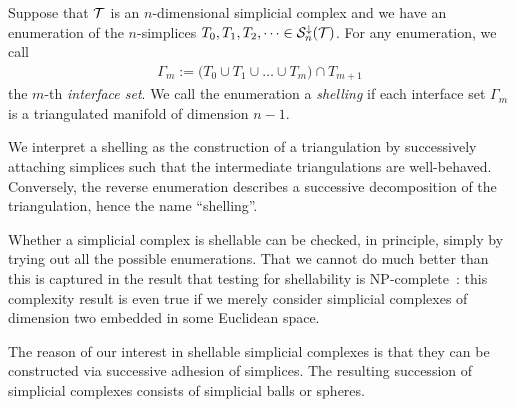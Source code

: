 \documentclass[10pt,a4paper]{article}
\newcommand{\mwl}[1]{{\color{red}#1}}
\begin{document}



Suppose that ${\mathcal T}$ is an $n$-dimensional simplicial complex and we have an enumeration of the $n$-simplices $T_{0}, T_{1}, T_{2}, \dots \in {\mathcal S}^{\downarrow}_{n}({\mathcal T})$.
For any enumeration, we call 
\begin{align*}
    \Gamma_m 
    := 
    \big( 
        T_{0} \cup T_{1} \cup \dots \cup T_{m} 
    \big) 
    \cap 
    T_{m+1}
\end{align*}
the $m$-th \textit{interface set}. 
We call the enumeration a \emph{shelling} if each interface set $\Gamma_m$ is a triangulated manifold of dimension $n-1$. 

\begin{remark}
    We interpret a shelling as the construction of a triangulation 
    by successively attaching simplices such that the intermediate triangulations are well-behaved. 
    Conversely, the reverse enumeration describes a successive decomposition of the triangulation, hence the name ``shelling''.
\end{remark}
\begin{remark}
    Whether a simplicial complex is shellable can be checked, in principle, simply by trying out all the possible enumerations.
    That we cannot do much better than this is captured in the result that testing for shellability is NP-complete~\cite{goaoc2019shellability}:
    this complexity result is even true if we merely consider simplicial complexes of dimension two embedded in some Euclidean space.
\end{remark}


The reason of our interest in shellable simplicial complexes is that they can be constructed via successive adhesion of simplices.
The resulting succession of simplicial complexes consists of simplicial balls or spheres. 
\end{document}
